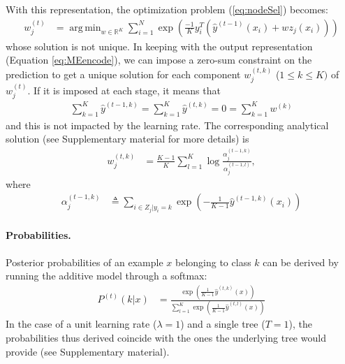 \documentclass{article}
\DeclareMathOperator*{\argmin}{arg\,min}
\begin{document}
With this representation, the optimization problem (\ref{eq:nodeSel}) becomes:
\begin{align}\label{eq:MEmin}
w_j^{(t)} &=  \argmin_{w \in \mathbb{R}^K} \sum_{i=1}^N \exp 
\left(\frac{-1}{K} y_i^T \left(\hat{y}^{(t-1)}(x_i) + w z_j(x_i) \right)\right)
\end{align}
whose solution is not unique.
In keeping with the output representation (Equation \ref{eq:MEencode}), we can 
impose a zero-sum constraint on the prediction to get a unique solution for 
each component $w_j^{(t,k)}$ ($1\leq k \leq K)$ of $w_j^{(t)}$. If it is 
imposed at each stage, it means that
\begin{align}\label{eq:MEzeroSum}
\sum_{k=1}^{K} \hat{y}^{(t-1, k)} = \sum_{k=1}^{K} 
\hat{y}^{(t, k)} = 0 = \sum_{k=1}^{K} w^{(k)}
\end{align}
and this is not impacted by the learning rate. The corresponding analytical solution (see 
Supplementary material for more details) is
\begin{align}\label{eq:MEsolution}
w_j^{(t,k)} &= \frac{K-1}{K}  \sum_{l=1}^{K} \log \frac{\alpha_j^{(t-1, 
k)}}{\alpha_j^{(t-1, l)}},
\end{align}
where
\begin{align}\label{eq:MEClsErrZS}
\alpha_j^{(t-1, k)} &\triangleq \sum_{i \in Z_j|y_i=k} \exp \left( 
-\frac{1}{K-1} \hat{y}^{(t-1, k)}(x_i) \right) 
\end{align}

\paragraph{Probabilities.}
Posterior probabilities of an example $x$ belonging to class $k$ can be derived 
by running the additive model through a softmax:
\begin{align}\label{eq:MEproba}
P^{(t)}(k|x) &= \frac{\exp \left(\frac{1}{K-1} \hat{y}^{(t, k)}(x) 
\right)}{\sum_{l=1}^K\exp \left(\frac{1}{K-1} \hat{y}^{(t, l)}(x) \right)}
\end{align}
In the case of a unit learning rate ($\lambda = 1$) and a single tree ($T=1$), 
the probabilities thus derived coincide with the ones the underlying tree would 
provide (see Supplementary material).
\end{document}
